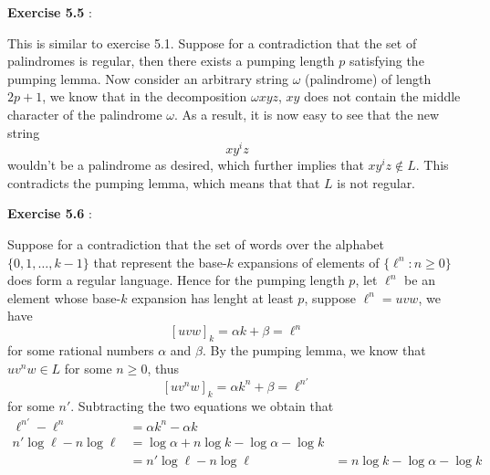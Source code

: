 \documentclass{article}
\newenvironment{solution}[1][\proofname]{
    \proof[\textbf{Solution:}] \renewcommand{\qedsymbol}{$\bell$}
}{\endproof}
\begin{document}
\noindent \textbf{Exercise 5.5} \label{exercise5.5}: 

\begin{solution}
    This is similar to exercise 5.1. Suppose for a contradiction that the set of palindromes is regular, then there exists a pumping length $p$ satisfying the pumping lemma. Now consider an arbitrary string $\omega$ (palindrome) of length $2p + 1$, we know that in the decomposition $\omega xyz$, $xy$ does not contain the middle character of the palindrome $\omega$. As a result, it is now easy to see that the new string 
    \[ x y^i z \]
    wouldn't be a palindrome as desired, which further implies that $x y^i z \notin L$. This contradicts the pumping lemma, which means that that $L$ is not regular. 
\end{solution}

\noindent \textbf{Exercise 5.6} : 

\begin{solution}
    Suppose for a contradiction that the set of words over the alphabet $\{0, 1, \ldots, k-1\}$ that represent the base-$k$ expansions of elements of $\{\ell^n : n \geq 0\}$ does form a regular language. Hence for the pumping length $p$, let $\ell^n$ be an element whose base-$k$ expansion has lenght at least $p$, suppose $\ell^n = uvw$, we have 
    \[ [uvw]_k = \alpha k + \beta = \ell^n \]
    for some rational numbers $\alpha$ and $\beta$. By the pumping lemma, we know that $uv^nw \in L$ for some $n \geq 0$, thus 
    \[ [uv^nw]_k = \alpha k^n + \beta = \ell^{n'} \]
    for some $n'$. Subtracting the two equations we obtain that 
    \begin{align*}
        \ell^{n'} - \ell^n & = \alpha k^n - \alpha k \\ 
        n' \log \ell - n \log \ell & = \log \alpha + n \log k - \log \alpha - \log k \\ 
        & = n' \log \ell - n \log \ell & = n \log k - \log \alpha - \log k
    \end{align*}
\end{solution}
\end{document}

